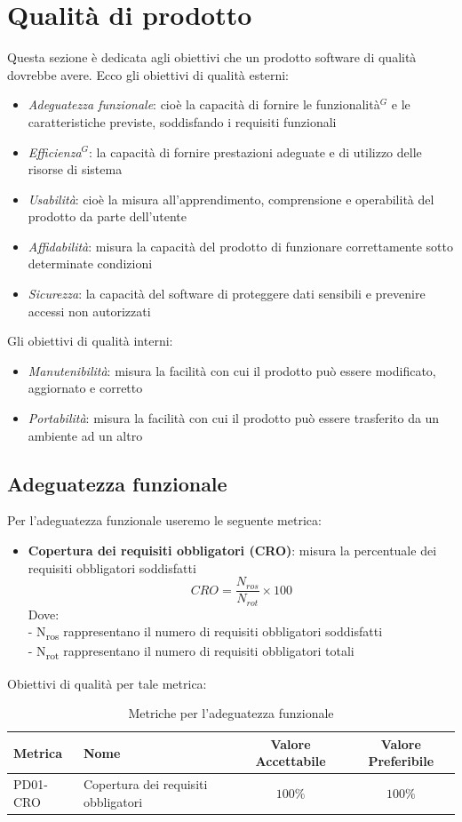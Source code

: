 \documentclass[a4paper,10pt]{article}
\begin{document}
\section{Qualità di prodotto}
Questa sezione è dedicata agli obiettivi che un prodotto software di qualità dovrebbe avere. Ecco gli obiettivi di qualità esterni:
\begin{itemize}
    \item \textit{Adeguatezza funzionale}: cioè la capacità di fornire le funzionalità$^G$ e le caratteristiche previste, soddisfando i requisiti funzionali
    \item \textit{Efficienza$^G$}: la capacità di fornire prestazioni adeguate e di utilizzo delle risorse di sistema
    \item \textit{Usabilità}: cioè la misura all'apprendimento, comprensione e operabilità del prodotto da parte dell'utente
    \item \textit{Affidabilità}: misura la capacità del prodotto di funzionare correttamente sotto determinate condizioni
    \item \textit{Sicurezza}: la capacità del software di proteggere dati sensibili e prevenire accessi non autorizzati
\end{itemize}
Gli obiettivi di qualità interni:
\begin{itemize}
    \item \textit{Manutenibilità}: misura la facilità con cui il prodotto può essere modificato, aggiornato e corretto
    \item \textit{Portabilità}: misura la facilità con cui il prodotto può essere trasferito da un ambiente ad un altro
\end{itemize}
\subsection{Adeguatezza funzionale}
Per l'adeguatezza funzionale useremo le seguente metrica:
\begin{itemize}
    \item \textbf{Copertura dei requisiti obbligatori (CRO)}: misura la percentuale dei requisiti obbligatori soddisfatti
    \[
        CRO = \frac{N_{ros}}{N_{rot}} \times 100
    \]
    Dove:  \\
    - N\textsubscript{ros} rappresentano il numero di requisiti obbligatori soddisfatti \\
    - N\textsubscript{rot} rappresentano il numero di requisiti obbligatori totali
\end{itemize}
Obiettivi di qualità per tale metrica: 
\begin{table}[H]
\centering
\renewcommand{\arraystretch}{1.2}
\begin{tabular}{|l|l|c|c|}
\hline
\textbf{Metrica} & \textbf{Nome} & \textbf{Valore Accettabile} & \textbf{Valore Preferibile} \\
\hline
PD01-CRO & Copertura dei requisiti obbligatori & $100\%$ & $100\%$ \\
\hline
\end{tabular}
\caption{Metriche per l'adeguatezza funzionale}
\label{tab:metriche-adfunzionale}
\end{table}
\end{document}
